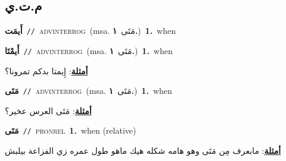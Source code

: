 \documentclass[10pt,a4paper,twoside]{article} %
\begin{document}
\begin{multicols}{2}
\vspace{-3mm}
\subsection*{\color{blue}\foreignlanguage{arabic}{م.ت.ي}\color{blue}{}} 

{\setlength\topsep{0pt}\textbf{\foreignlanguage{arabic}{أَيمَت}}\ {\color{gray}\texttt{//}\color{black}}\ \textsc{adv\textunderscore interrog}\ \color{gray}(msa. \foreignlanguage{arabic}{مَتَى}~\foreignlanguage{arabic}{\textbf{١.}})\color{black}\ \textbf{1.}~when\ } \vspace{2mm}

{\setlength\topsep{0pt}\textbf{\foreignlanguage{arabic}{أَيمْتَا}}\ {\color{gray}\texttt{//}\color{black}}\ \textsc{adv\textunderscore interrog}\ \color{gray}(msa. \foreignlanguage{arabic}{مَتَى}~\foreignlanguage{arabic}{\textbf{١.}})\color{black}\ \textbf{1.}~when\  \begin{flushright}\color{gray}\foreignlanguage{arabic}{\textbf{\underline{\foreignlanguage{arabic}{أمثلة}}}: إِيمتا بدكم تمرونا؟}\end{flushright}\color{black}} \vspace{2mm}

{\setlength\topsep{0pt}\textbf{\foreignlanguage{arabic}{مَتَى}}\ {\color{gray}\texttt{//}\color{black}}\ \textsc{adv\textunderscore interrog}\ \color{gray}(msa. \foreignlanguage{arabic}{مَتَى}~\foreignlanguage{arabic}{\textbf{١.}})\color{black}\ \textbf{1.}~when\  \begin{flushright}\color{gray}\foreignlanguage{arabic}{\textbf{\underline{\foreignlanguage{arabic}{أمثلة}}}: مَتَى العرس عخير؟}\end{flushright}\color{black}} \vspace{2mm}

{\setlength\topsep{0pt}\textbf{\foreignlanguage{arabic}{مَتَى}}\ {\color{gray}\texttt{//}\color{black}}\ \textsc{pron\textunderscore rel}\ \textbf{1.}~when (relative)\  \begin{flushright}\color{gray}\foreignlanguage{arabic}{\textbf{\underline{\foreignlanguage{arabic}{أمثلة}}}: مابعرف مِن مَتَى وهو هامه شكله هيك ماهو طول عمره زي الفزاعة بيلبش}\end{flushright}\color{black}} \vspace{2mm}


\end{multicols}
\end{document}
